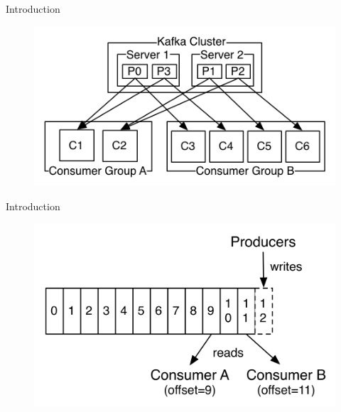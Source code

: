 \begin{frame}[plain,t]{Introduction} %
    \vspace{2ex}
     \begin{figure}
        \centering
        \includegraphics[width=0.9\linewidth]{image/0103}
        \label{fig:0103}
    \end{figure}
    
    
    
    
\end{frame}
\begin{frame}[plain,t]{Introduction} %
    \vspace{2ex}
    
     \begin{figure}
        \centering
        \includegraphics[width=0.9\linewidth]{image/0104}
        \label{fig:0104}
    \end{figure}
    
    
    
\end{frame}
